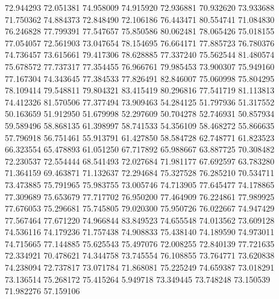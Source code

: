 72.944293
72.051381
74.958009
74.915920
72.936881
70.932620
73.933688
71.750362
74.884373
72.848490
72.106186
76.443471
80.554741
71.084830
76.246828
77.799391
77.547657
75.850586
80.062481
78.065426
75.018155
77.054057
72.561903
73.047654
78.154695
76.664171
77.885723
76.780376
74.736457
73.615661
79.417306
78.628885
77.337240
75.562544
81.480574
75.678572
77.737317
77.354455
76.966761
79.985453
73.900307
75.949160
77.167304
74.343645
77.384533
77.826491
82.846007
75.060998
75.804295
78.109414
79.548811
79.804321
83.415419
80.296816
77.541719
81.113813
74.412326
81.570506
77.377494
73.909463
54.284125
51.797936
51.317552
50.163659
51.912950
51.679998
52.297609
50.704278
52.746931
50.857934
59.589496
58.868135
61.398997
58.741533
54.356109
58.468272
55.866635
57.796918
56.751461
55.913791
61.427850
58.584728
62.748771
61.823523
66.323554
65.478893
61.051250
67.717892
65.988667
63.887725
70.308482
72.230537
72.554444
68.541493
72.027684
71.981177
67.692597
63.783280
71.364159
69.463871
71.132637
72.294684
75.327528
76.285210
70.534711
73.473885
75.791965
75.983755
73.005746
74.713905
77.645477
74.178865
77.309689
75.653679
77.717702
76.950200
77.464909
76.224861
77.989925
77.676053
75.296681
75.745805
79.020300
75.950726
76.022667
74.947429
77.567464
77.671220
74.966844
83.849523
74.655548
74.013562
73.609128
74.536116
74.179236
71.757438
74.908833
75.438140
74.189590
74.973011
74.715665
77.144885
75.625543
75.497076
72.008255
72.840139
77.721635
72.334921
70.478621
74.344758
73.745554
76.108855
73.764771
73.620838
74.238094
72.737817
73.071784
71.868081
75.225249
74.659387
73.018291
73.136514
75.268172
75.415264
5.949718
73.349445
73.748248
73.150539
71.982276
57.159106
